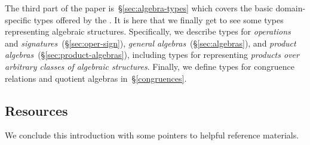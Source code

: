 The third part of the paper is~\S\ref{sec:algebra-types} which covers the basic domain-specific types offered by the \ualib. It is here that we finally get to see some types representing algebraic structures.  Specifically, we describe types for \emph{operations} and \emph{signatures}~(\S\ref{sec:oper-sign}), \emph{general algebras}~(\S\ref{sec:algebras}), and \emph{product algebras}~(\S\ref{sec:product-algebras}), including types for representing \emph{products over arbitrary classes of algebraic structures}. Finally, we define types for congruence relations and quotient algebras in~\S\ref{congruences}.

\newcommand\otherparta{\textit{Part 2: homomorphisms, terms, and subalgebras}~\cite{DeMeo:2021-2}.}
\newcommand\otherpartb{\textit{Part 3: free algebras, equational classes, and Birkhoff's theorem}~\cite{DeMeo:2021-3}.}

\subsection{Resources}
We conclude this introduction with some pointers to helpful reference materials.
